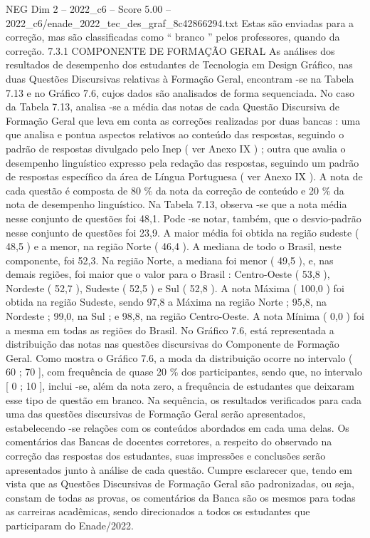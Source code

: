 \begin{textsample}{NEG Dim 2 – 2022\_c6 – Score 5.00 – 2022\_c6/enade\_2022\_tec\_des\_graf\_8c42866294.txt}
Estas são enviadas para a correção, mas são classificadas como “ branco ” pelos professores, quando da correção. 7.3.1 COMPONENTE DE FORMAÇÃO GERAL As análises dos resultados de desempenho dos estudantes de Tecnologia em Design Gráfico, nas duas Questões Discursivas relativas à Formação Geral, encontram -se na Tabela 7.13 e no Gráfico 7.6, cujos dados são analisados de forma sequenciada.
No caso da Tabela 7.13, analisa -se a média das notas de cada Questão Discursiva de Formação Geral que leva em conta as correções realizadas por duas bancas : uma que analisa e pontua aspectos relativos ao conteúdo das respostas, seguindo o padrão de respostas divulgado pelo Inep ( ver Anexo IX ) ; outra que avalia o desempenho linguístico expresso pela redação das respostas, seguindo um padrão de respostas específico da área de Língua Portuguesa ( ver Anexo IX ).
A nota de cada questão é composta de 80 \% da nota da correção de conteúdo e 20 \% da nota de desempenho linguístico.
Na Tabela 7.13, observa -se que a nota média nesse conjunto de questões foi 48,1.
Pode -se notar, também, que o desvio-padrão nesse conjunto de questões foi 23,9.
A maior média foi obtida na região sudeste ( 48,5 ) e a menor, na região Norte ( 46,4 ).
A mediana de todo o Brasil, neste componente, foi 52,3.
Na região Norte, a mediana foi menor ( 49,5 ), e, nas demais regiões, foi maior que o valor para o Brasil : Centro-Oeste ( 53,8 ), Nordeste ( 52,7 ), Sudeste ( 52,5 ) e Sul ( 52,8 ).
A nota Máxima ( 100,0 ) foi obtida na região Sudeste, sendo 97,8 a Máxima na região Norte ; 95,8, na Nordeste ; 99,0, na Sul ; e 98,8, na região Centro-Oeste.
A nota Mínima ( 0,0 ) foi a mesma em todas as regiões do Brasil.
No Gráfico 7.6, está representada a distribuição das notas nas questões discursivas do Componente de Formação Geral.
Como mostra o Gráfico 7.6, a moda da distribuição ocorre no intervalo ( 60 ; 70 ], com frequência de quase 20 \% dos participantes, sendo que, no intervalo [ 0 ; 10 ], inclui -se, além da nota zero, a frequência de estudantes que deixaram esse tipo de questão em branco.
Na sequência, os resultados verificados para cada uma das questões discursivas de Formação Geral serão apresentados, estabelecendo -se relações com os conteúdos abordados em cada uma delas.
Os comentários das Bancas de docentes corretores, a respeito do observado na correção das respostas dos estudantes, suas impressões e conclusões serão apresentados junto à análise de cada questão.
Cumpre esclarecer que, tendo em vista que as Questões Discursivas de Formação Geral são padronizadas, ou seja, constam de todas as provas, os comentários da Banca são os mesmos para todas as carreiras acadêmicas, sendo direcionados a todos os estudantes que participaram do Enade/2022.

\end{textsample}
